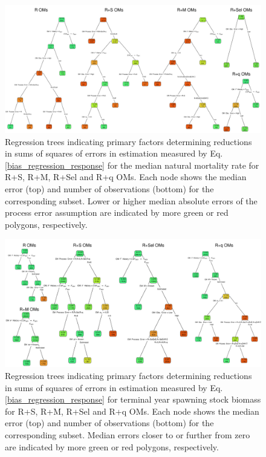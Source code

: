 \documentclass[
  12pt,
]{article}
\begin{document}
\begin{landscape}
\begin{figure}
\begin{center}
\includegraphics{med_M_bias_regtree_plots}
\end{center}
\caption{Regression trees indicating primary factors determining reductions in sums of squares of errors in estimation measured by Eq. \ref{bias_regression_response} for the median natural mortality rate for R+S, R+M, R+Sel and R+q OMs. Each node shows the median error (top) and number of observations (bottom) for the corresponding subset. Lower or higher median absolute errors of the process error assumption are indicated by more green or red polygons, respectively.}\label{med_M_bias_regtree}
\end{figure}
\end{landscape}

\begin{landscape}
\begin{figure}
\begin{center}
\includegraphics{SSB_bias_regtree_plots}
\end{center}
\caption{Regression trees indicating primary factors determining reductions in sums of squares of errors in estimation measured by Eq. \ref{bias_regression_response} for terminal year spawning stock biomass for R+S, R+M, R+Sel and R+q OMs. Each node shows the median error (top) and number of observations (bottom) for the corresponding subset. Median errors closer to or further from zero are indicated by more green or red polygons, respectively.}\label{SSB_bias_regtree}
\end{figure}
\end{landscape}
\end{document}
